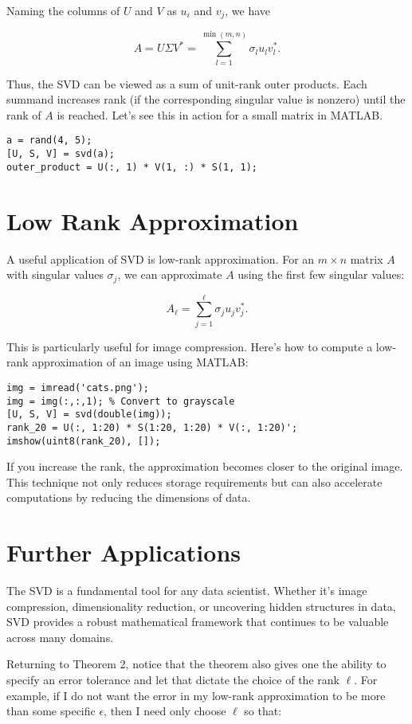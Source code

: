 \documentclass{ximera}
\begin{document}
Naming the columns of \( U \) and \( V \) as \( u_i \) and \( v_j \), we have

\[
A = U \Sigma V^* = \sum_{l=1}^{\min(m,n)} \sigma_l u_l v_l^*.
\]

Thus, the SVD can be viewed as a sum of unit-rank outer products. Each summand increases rank (if the corresponding singular value is nonzero) until the rank of \( A \) is reached. Let's see this in action for a small matrix in MATLAB.

\begin{verbatim}
a = rand(4, 5);
[U, S, V] = svd(a);
outer_product = U(:, 1) * V(1, :) * S(1, 1);
\end{verbatim}

\section{Low Rank Approximation}

A useful application of SVD is low-rank approximation. For an \( m \times n \) matrix \( A \) with singular values \( \sigma_j \), we can approximate \( A \) using the first few singular values:

\[
A_\ell = \sum_{j=1}^\ell \sigma_j u_j v_j^*.
\]

This is particularly useful for image compression. Here’s how to compute a low-rank approximation of an image using MATLAB:

\begin{verbatim}
img = imread('cats.png');
img = img(:,:,1); % Convert to grayscale
[U, S, V] = svd(double(img));
rank_20 = U(:, 1:20) * S(1:20, 1:20) * V(:, 1:20)';
imshow(uint8(rank_20), []);
\end{verbatim}

If you increase the rank, the approximation becomes closer to the original image. This technique not only reduces storage requirements but can also accelerate computations by reducing the dimensions of data.

\section{Further Applications}

The SVD is a fundamental tool for any data scientist. Whether it’s image compression, dimensionality reduction, or uncovering hidden structures in data, SVD provides a robust mathematical framework that continues to be valuable across many domains.

Returning to Theorem 2, notice that the theorem also gives one the ability to specify an error tolerance and let that dictate the choice of the rank \( \ell \). For example, if I do not want the error in my low-rank approximation to be more than some specific \( \epsilon \), then I need only choose \( \ell \) so that:
\end{document}
